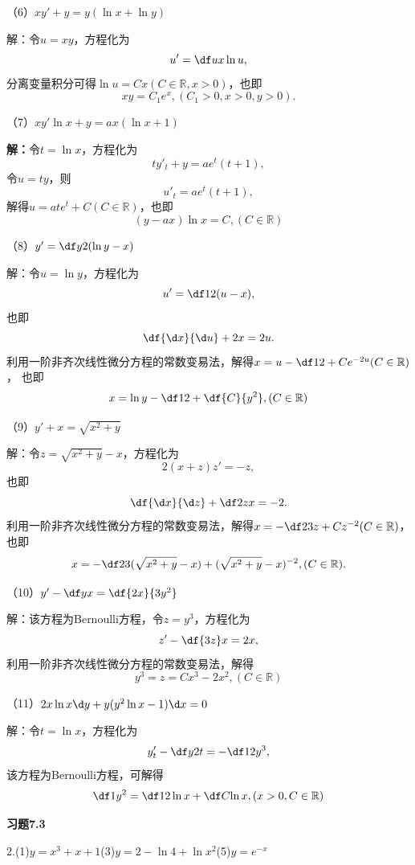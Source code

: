 （6）$xy'+y=y(\ln x+\ln y)$

解：令$u=xy$，方程化为
$$u'=\df ux\ln u,$$
分离变量积分可得$\ln u=Cx(C\in\mathbb{R},x>0)$，也即
$$xy=C_1e^x,(C_1>0,x>0,y>0).$$

% 

（7）$xy'\ln x+y=ax(\ln x+1)$

{\bf 解：}令$t=\ln x$，方程化为
$$ty'_t+y=ae^t(t+1),$$
令$u=ty$，则
$$u'_t=ae^t(t+1),$$
解得$u=ate^t+C(C\in\mathbb{R})$，也即
$$(y-ax)\ln x=C,(C\in\mathbb{R})$$

（8）$y'=\df y{2(\ln y-x)}$

解：令$u=\ln y$，方程化为
$$u'=\df1{2(u-x)},$$
也即
$$\df{\d x}{\d u}+2x=2u.$$
利用一阶非齐次线性微分方程的常数变易法，解得$x=u-\df12+Ce^{-2u}(C\in\mathbb{R})$，
也即
$$x=\ln y-\df12+\df{C}{y^2},(C\in\mathbb{R})$$

（9）$y'+x=\sqrt{x^2+y}$

解：令$z=\sqrt{x^2+y}-x$，方程化为
$$2(x+z)z'=-z,$$
也即
$$\df{\d x}{\d z}+\df2zx=-2.$$
利用一阶非齐次线性微分方程的常数变易法，解得$x=-\df23z+Cz^{-2}(C\in\mathbb{R})$，也即
$$x=-\df23(\sqrt{x^2+y}-x)+(\sqrt{x^2+y}-x)^{-2},(C\in\mathbb{R}).$$

（10）$y'-\df yx=\df{2x}{3y^2}$

解：该方程为Bernoulli方程，令$z=y^3$，方程化为
$$z'-\df{3z}x=2x,$$
利用一阶非齐次线性微分方程的常数变易法，解得
$$y^3=z=Cx^3-2x^2,(C\in\mathbb{R})$$

（11）$2x\ln x\d y+y(y^2\ln x-1)\d x=0$

解：令$t=\ln x$，方程化为
$$y'_t-\df y{2t}=-\df12y^3,$$
该方程为Bernoulli方程，可解得
$$\df1{y^2}=\df12\ln x+\df C{\ln x},(x>0,C\in\mathbb{R})$$

% 

{\bf 习题7.3}

\bigskip

2.\;(1)$y=x^3+x+1$\quad(3)$y=2-\ln4+\ln x^2$\quad(5)$y=e^{-x}$

